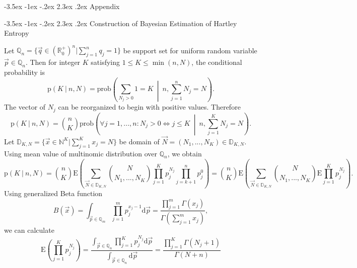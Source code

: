\documentclass[a4paper,10pt]{article}
\makeatletter
\renewcommand\section{\@startsection {section}{1}{\z@}%
                                   {-3.5ex \@plus -1ex \@minus -.2ex}%
                                   {2.3ex \@plus.2ex}%
                                   {\large\bfseries}}
\renewcommand\subsection{\@startsection {subsection}{1}{\z@}%
                                   {-3.5ex \@plus -1ex \@minus -.2ex}%
                                   {2.3ex \@plus.2ex}%
                                   {\normalsize\bfseries}}
\makeatother
\begin{document}
\begin{appendices}

\section {Appendix}

\subsection {Construction of Bayesian Estimation of Hartley Entropy}

Let $\mathbb{Q}_{n} = \{ \vec{q} \in (\mathbb{R}_{0}^{+})^{n} | \sum_{j=1}^{n}q_{j} = 1 \}$ be support set for uniform random variable $\vec{p} \in \mathbb{Q}_{n}$. Then for integer $K$ satisfying $1 \le K \le \min(n,N)$, the conditional probability is 
\begin{equation} 
\label{eq:probpkn}
\text{p}(K \: | \: n,N) = \text{prob}\left(\sum_{N_{j}>0} 1 = K \: \middle| \: n, \sum_{j=1}^{n}N_{j} = N\right).
\end{equation}
The vector of $N_{j}$ can be reorganized to begin with positive values. Therefore
\begin{equation} 
\label{eq:probbinom}
\text{p}(K \: | \: n,N) = {n \choose K}\text{prob}\left( \forall j=1,...,n : N_{j} > 0 \Leftrightarrow j \le K \: \middle| \: n, \sum_{j=1}^{K}N_{j}=N\right).
\end{equation}
Let $\mathbb{D}_{K,N} = \{ \vec{x} \in \mathbb{N}^K | \sum_{j=1}^{K}x_{j} = N \}$ be domain of $\vec{N} = (N_{1},...,N_{K}) \in \mathbb{D}_{K,N}$. Using mean value of multinomic distribution over $\mathbb{Q}_{n}$, we obtain
\begin{equation} 
\label{eq:probbinomexp}
\text{p}(K \: | \: n,N) = {n \choose K} \text{E}\left(\sum_{\vec{N} \in \mathbb{D}_{K,N}} {N \choose N_{1},...,N_{K}} \prod_{j=1}^{K}p_{j}^{N_{j}} \prod_{j=k+1}^{n}p_{j}^{0} \right) = {n \choose K} \text{E}\left(\sum_{\vec{N} \in \mathbb{D}_{K,N}} {N \choose N_{1},...,N_{K}} \text{E}\prod_{j=1}^{K}p_{j}^{N_{j}}\right).
\end{equation}
Using generalized Beta function
\begin{equation} 
\label{eq:betafce}
B(\vec{x}) = \int_{\vec{p} \in \mathbb{Q}_{m}} \prod_{j=1}^{m} p_{j}^{x_{j}-1} \text{d}\vec{p} = \frac{\prod_{j=1}^{m} \Gamma(x_{j})}{\Gamma(\sum_{j=1}^{m}x_{j})},
\end{equation}
we can calculate
\begin{equation} 
\label{eq:expprod}
\text{E}(\prod_{j=1}^{K}p_{j}^{N_{j}}) = \frac{\int_{\vec{p} \in \mathbb{Q}_{n}} \prod_{j=1}^{K} p_{j}^{N_{j}} \text{d}\vec{p}}{\int_{\vec{p} \in \mathbb{Q}_{n}} \text{d}\vec{p}} = \frac{\prod_{j=1}^{K}\Gamma(N_{j}+1)}{\Gamma(N+n)}

\end{equation}
\end{appendices}
\end{document}
